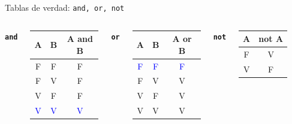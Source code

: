 \documentclass{beamer}
\begin{document}
    \begin{frame}[fragile,t]{Tablas de verdad: \texttt{and, or, not}}
        \begin{columns}[T,onlytextwidth]
            \centering
            \textbf{\texttt{and}}\\[0.4em]
            \begin{tabular}{|c|c|c|}
                \hline
                A & B & A and B \\
                \hline
                F & F & F \\
                \hline
                F & V & F \\
                \hline
                V & F & F \\
                \hline
                \textcolor{blue}{V} & \textcolor{blue}{V} & \textcolor{blue}{V} \\
                \hline
            \end{tabular}
    
            \centering
            \textbf{\texttt{or}}\\[0.4em]
            \begin{tabular}{|c|c|c|}
                \hline
                A & B & A or B \\
                \hline
                \textcolor{blue}{F} & \textcolor{blue}{F} & \textcolor{blue}{F} \\
                \hline
                F & V & V \\
                \hline
                V & F & V \\
                \hline
                V & V & V \\
                \hline
            \end{tabular}
    
            \centering
            \textbf{\texttt{not}}\\[0.4em]
            \begin{tabular}{|c|c|}
                \hline
                A & not A \\
                \hline
                F & V \\
                \hline
                V & F \\
                \hline
            \end{tabular}
        \end{columns}
    \end{frame}
\end{document}
